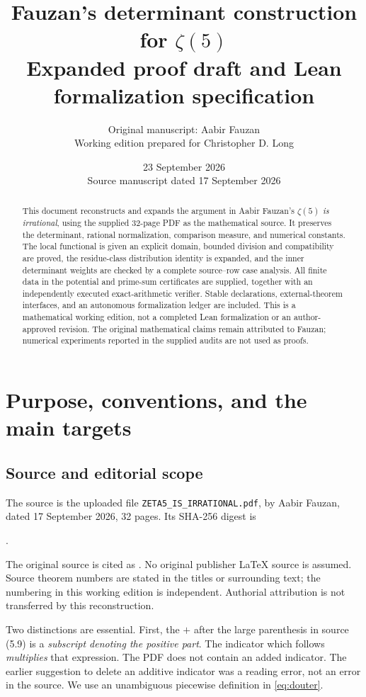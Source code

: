 \documentclass[11pt]{article}
\title{Fauzan's determinant construction for $\zeta(5)$\\[3pt]
\large Expanded proof draft and Lean formalization specification}
\author{Original manuscript: Aabir Fauzan\\
\small Working edition prepared for Christopher D. Long}
\date{23 September 2026\\\small Source manuscript dated 17 September 2026}
\theoremstyle{definition}
\theoremstyle{remark}\newtheorem{remark}[theorem]{Remark}
\numberwithin{equation}{section}
\begin{document}
\maketitle
\begin{abstract}
This document reconstructs and expands the argument in Aabir Fauzan's
\emph{$\zeta(5)$ is irrational}, using the supplied 32-page PDF as the
mathematical source. It preserves the determinant, rational normalization,
comparison measure, and numerical constants. The local functional is given
an explicit domain, bounded division and compatibility are proved, the
residue-class distribution identity is expanded, and the inner determinant
weights are checked by a complete source--row case analysis. All finite data
in the potential and prime-sum certificates are supplied, together with an
independently executed exact-arithmetic verifier. Stable declarations,
external-theorem interfaces, and an autonomous formalization ledger are
included. This is a mathematical working edition, not a completed Lean
formalization or an author-approved revision. The original mathematical
claims remain attributed to Fauzan; numerical experiments reported in the
supplied audits are not used as proofs.
\end{abstract}
\tableofcontents
\newpage

\section{Purpose, conventions, and the main targets}
\label{sec:overview}

\subsection{Source and editorial scope}
The source is the uploaded file \texttt{ZETA5\_IS\_IRRATIONAL.pdf}, by Aabir
Fauzan, dated 17 September 2026, 32 pages. Its SHA-256 digest is
\begin{center}\small\ttfamily
{}.
\end{center}
The original source is cited as \cite{Fauzan}. No original publisher \LaTeX{} source is assumed. Source theorem numbers
are stated in the titles or surrounding text; the numbering in this working
edition is independent. Authorial attribution is not transferred by this
reconstruction.

Two distinctions are essential. First, the $+$ after the large parenthesis
in source (5.9) is a \emph{subscript denoting the positive part}. The
indicator which follows \emph{multiplies} that expression. The PDF does not
contain an added indicator. The earlier suggestion to delete an additive
indicator was a reading error, not an error in the source. We use an
unambiguous piecewise definition in \eqref{eq:douter}.
\end{document}
